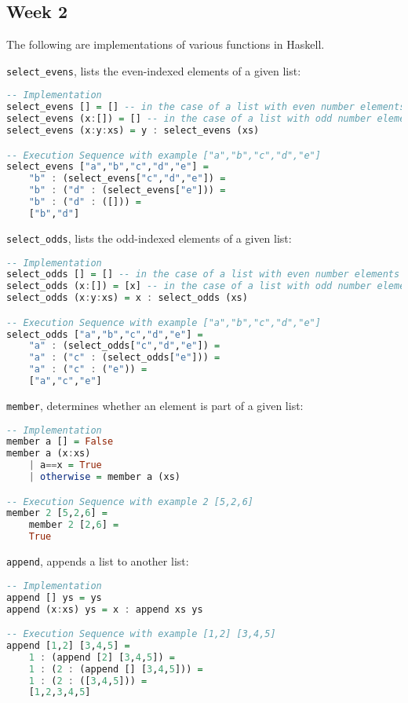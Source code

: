 \documentclass{article}
\theoremstyle{theorem}
\theoremstyle{definition}
\theoremstyle{remark}
\begin{document}
\subsection{Week 2}


The following are implementations of various functions in Haskell. \newline

\noindent \texttt{select\_evens}, lists the even-indexed elements of a given list:
\begin{lstlisting}[language=Haskell]
-- Implementation
select_evens [] = [] -- in the case of a list with even number elements
select_evens (x:[]) = [] -- in the case of a list with odd number elements
select_evens (x:y:xs) = y : select_evens (xs)

-- Execution Sequence with example ["a","b","c","d","e"]
select_evens ["a","b","c","d","e"] =
    "b" : (select_evens["c","d","e"]) = 
    "b" : ("d" : (select_evens["e"])) =
    "b" : ("d" : ([])) = 
    ["b","d"]
\end{lstlisting} 

\noindent \texttt{select\_odds}, lists the odd-indexed elements of a given list:
\begin{lstlisting}[language=Haskell]
-- Implementation
select_odds [] = [] -- in the case of a list with even number elements
select_odds (x:[]) = [x] -- in the case of a list with odd number elements
select_odds (x:y:xs) = x : select_odds (xs)

-- Execution Sequence with example ["a","b","c","d","e"]
select_odds ["a","b","c","d","e"] =
    "a" : (select_odds["c","d","e"]) = 
    "a" : ("c" : (select_odds["e"])) =
    "a" : ("c" : ("e")) = 
    ["a","c","e"]
\end{lstlisting}

\noindent \texttt{member}, determines whether an element is part of a given list:
\begin{lstlisting}[language=Haskell]
-- Implementation
member a [] = False
member a (x:xs)
    | a==x = True
    | otherwise = member a (xs)

-- Execution Sequence with example 2 [5,2,6]
member 2 [5,2,6] =
    member 2 [2,6] = 
    True
\end{lstlisting}

\newpage %

\noindent \texttt{append}, appends a list to another list:
\begin{lstlisting}[language=Haskell]
-- Implementation
append [] ys = ys
append (x:xs) ys = x : append xs ys

-- Execution Sequence with example [1,2] [3,4,5]
append [1,2] [3,4,5] =
    1 : (append [2] [3,4,5]) = 
    1 : (2 : (append [] [3,4,5])) =
    1 : (2 : ([3,4,5])) =
    [1,2,3,4,5]
\end{lstlisting}
\end{document}
